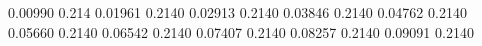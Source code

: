 0.00990 0.214
0.01961 0.2140
0.02913 0.2140
0.03846 0.2140
0.04762 0.2140
0.05660 0.2140
0.06542 0.2140
0.07407 0.2140
0.08257 0.2140
0.09091 0.2140
